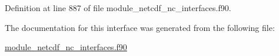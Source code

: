 Definition at line 887 of file module\+\_\+netcdf\+\_\+nc\+\_\+interfaces.\+f90.



The documentation for this interface was generated from the following file\+:\begin{DoxyCompactItemize}
\item 
\hyperlink{module__netcdf__nc__interfaces_8f90}{module\+\_\+netcdf\+\_\+nc\+\_\+interfaces.\+f90}\end{DoxyCompactItemize}
